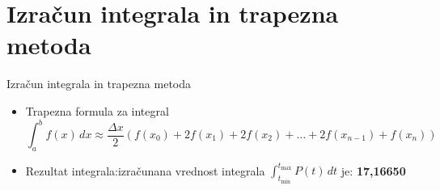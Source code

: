 \documentclass{beamer}
\begin{document}
\section{Izračun integrala in trapezna metoda}
\begin{frame}{Izračun integrala in trapezna metoda}
    \begin{itemize}
        \item {Trapezna formula za integral}
        \[
        \int_{a}^{b} f(x) \, dx \approx \frac{\Delta x}{2} \left( f(x_0) + 2f(x_1) + 2f(x_2) + \dots + 2f(x_{n-1}) + f(x_n) \right)
        \]
        \item Rezultat integrala:izračunana vrednost integrala
        \( 
        \int_{t_{\text{min}}}^{t_{\text{max}}} P(t) \, dt \) je: \textbf{17,16650}
    \end{itemize}
\end{frame}
\end{document}
